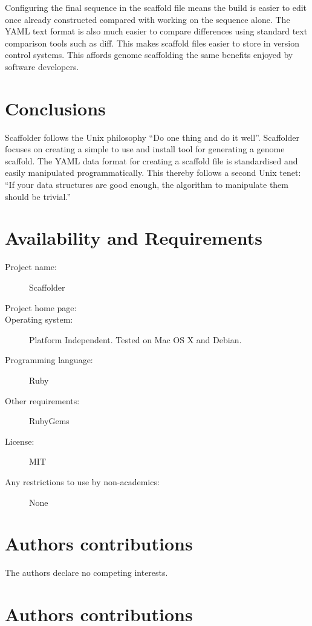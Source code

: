 \documentclass[10pt]{bmc_article}
\newenvironment{bmcformat}{\begin{raggedright}\baselineskip20pt\sloppy\setboolean{publ}{false}}{\end{raggedright}\baselineskip20pt\sloppy}
\begin{document}
\begin{bmcformat}
Configuring the final sequence in the scaffold file means the build is easier
to edit once already constructed compared with working on the sequence alone.
The YAML text format is also much easier to compare differences using standard
text comparison tools such as diff. This makes scaffold files easier to store
in version control systems. This affords genome scaffolding the same benefits
enjoyed by software developers. \pb

\section*{Conclusions} %

Scaffolder follows the Unix philosophy ``Do one thing and do it well''.
Scaffolder focuses on creating a simple to use and install tool for generating
a genome scaffold. The YAML data format for creating a scaffold file is
standardised and easily manipulated programmatically. This thereby follows
a second Unix tenet: ``If your data structures are good enough, the algorithm
to manipulate them should be trivial.''

\section*{Availability and Requirements} %

  \begin{description}
    \item[Project name:] Scaffolder
    \item[Project home page:] \scaffolder
    \item[Operating system:] Platform Independent. Tested on Mac OS X and
    Debian.
    \item[Programming language:] Ruby
    \item[Other requirements:] RubyGems
    \item[License:] MIT
    \item[Any restrictions to use by non-academics:] None
  \end{description}

\section*{Authors contributions}
  The authors declare no competing interests.
\section*{Authors contributions}


\end{bmcformat}
\end{document}
